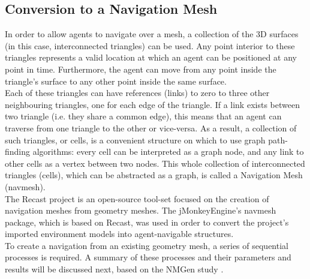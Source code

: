 \subsection{Conversion to a Navigation Mesh}
In order to allow agents to navigate over a mesh, a collection of the 3D surfaces (in this case, interconnected triangles) can be used. Any point interior to these triangles represents a valid location at which an agent can be positioned at any point in time. Furthermore, the agent can move from any point inside the triangle's surface to any other point inside the same surface.\\
Each of these triangles can have references (links) to zero to three other neighbouring triangles, one for each edge of the triangle. If a link exists between two triangle (i.e. they share a common edge), this means that an agent can traverse from one triangle to the other or vice-versa. As a result, a collection of such triangles, or cells, is a convenient structure on which to use graph path-finding algorithms: every cell can be interpreted as a graph node, and any link to other cells as a vertex between two nodes. This whole collection of interconnected triangles (cells), which can be abstracted as a graph, is called a Navigation Mesh (navmesh).\\
The Recast\cite{Recast} project is an open-source tool-set focused on the creation of navigation meshes from geometry meshes. The jMonkeyEngine's navmesh package, which is based on Recast, was used in order to convert the project's imported environment models into agent-navigable structures.\\
To create a navigation from an existing geometry mesh, a series of sequential processes is required. A summary of these processes and their parameters and results will be discussed next, based on the NMGen study \cite{NMGen}.
